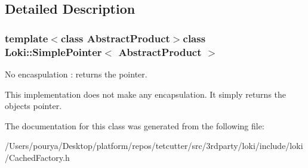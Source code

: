 \subsection{Detailed Description}
\subsubsection*{template$<$class Abstract\+Product$>$class Loki\+::\+Simple\+Pointer$<$ Abstract\+Product $>$}

No encaspulation \+: returns the pointer. 

This implementation does not make any encapsulation. It simply returns the object\textquotesingle{}s pointer. 

The documentation for this class was generated from the following file\+:\begin{DoxyCompactItemize}
\item 
/\+Users/pourya/\+Desktop/platform/repos/tetcutter/src/3rdparty/loki/include/loki/Cached\+Factory.\+h\end{DoxyCompactItemize}
